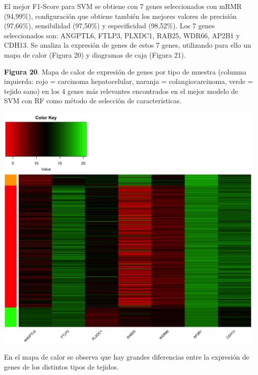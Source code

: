 El mejor F1-Score para SVM se obtiene con 7 genes seleccionados con mRMR (94,99\%), configuración que obtiene también los mejores valores de precisión (97,66\%), sensibilidad (97,50\%) y especificidad (98,52\%). Los 7 genes seleccionados son: ANGPTL6, FTLP3, PLXDC1, RAB25, WDR66, AP2B1 y CDH13. Se analiza la expresión de genes de estos 7 genes, utilizando para ello un mapa de calor (Figura 20) y diagramas de caja (Figura 21).

\newpage
\begin{center}
\textbf{Figura 20}. Mapa de calor de expresión de genes por tipo de muestra (columna izquierda: rojo = carcinoma hepatocelular, naranja = colangiocarcinoma, verde = tejido sano) en los 4 genes más relevantes encontrados en el mejor modelo de SVM con RF como método de selección de características.
\end{center}
\begin{center}
	\includegraphics[width=1\textwidth]{figuras/20_higado_multiclase_13_svm_heatmap_mejor_metodo.png} 
\end{center}

En el mapa de calor se observa que hay grandes diferencias entre la expresión de genes de los distintos tipos de tejidos.

